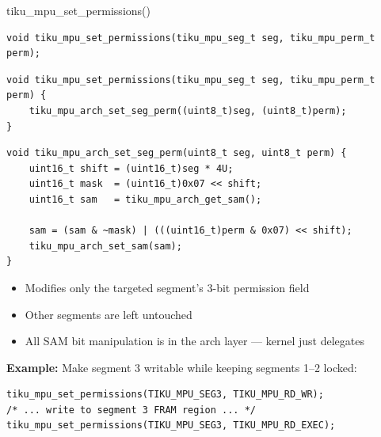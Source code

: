\documentclass[aspectratio=169, 10pt]{beamer}
\begin{document}
\begin{frame}[fragile]{tiku\_mpu\_set\_permissions()}
\begin{lstlisting}[style=cstyle]
void tiku_mpu_set_permissions(tiku_mpu_seg_t seg, tiku_mpu_perm_t perm);
\end{lstlisting}

\begin{lstlisting}[style=cstyle, title={kernel/memory/tiku\_mpu.c --- delegates to arch}]
void tiku_mpu_set_permissions(tiku_mpu_seg_t seg, tiku_mpu_perm_t perm) {
    tiku_mpu_arch_set_seg_perm((uint8_t)seg, (uint8_t)perm);
}
\end{lstlisting}

\begin{lstlisting}[style=cstyle, title={arch/msp430/tiku\_mpu\_arch.c --- register manipulation}]
void tiku_mpu_arch_set_seg_perm(uint8_t seg, uint8_t perm) {
    uint16_t shift = (uint16_t)seg * 4U;
    uint16_t mask  = (uint16_t)0x07 << shift;
    uint16_t sam   = tiku_mpu_arch_get_sam();

    sam = (sam & ~mask) | (((uint16_t)perm & 0x07) << shift);
    tiku_mpu_arch_set_sam(sam);
}
\end{lstlisting}

\vspace{0.3em}
\begin{itemize}
  \item Modifies only the targeted segment's 3-bit permission field
  \item Other segments are left untouched
  \item All SAM bit manipulation is in the arch layer --- kernel just delegates
\end{itemize}

\vspace{0.3em}
\textbf{Example:} Make segment 3 writable while keeping segments 1--2 locked:
\begin{lstlisting}[style=cstyle]
tiku_mpu_set_permissions(TIKU_MPU_SEG3, TIKU_MPU_RD_WR);
/* ... write to segment 3 FRAM region ... */
tiku_mpu_set_permissions(TIKU_MPU_SEG3, TIKU_MPU_RD_EXEC);
\end{lstlisting}
\end{frame}
\end{document}
